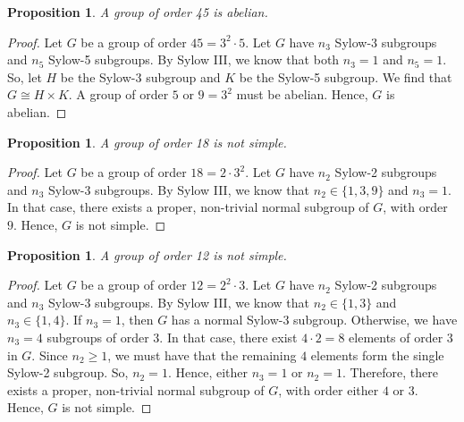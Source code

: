 \documentclass[a4paper, openany]{memoir}
\theoremstyle{definition}
\theoremstyle{plain}
\newtheorem{proposition}[definition]{Proposition}
\begin{document}
    \begin{proposition}
        A group of order 45 is abelian.
    \end{proposition}
    \begin{proof}
        Let $G$ be a group of order $45 = 3^2 \cdot 5$. Let $G$ have $n_3$ Sylow-3 subgroups and $n_5$ Sylow-5 subgroups. By Sylow III, we know that both $n_3 = 1$ and $n_5 = 1$. So, let $H$ be the Sylow-3 subgroup and $K$ be the Sylow-5 subgroup. We find that $G \cong H \times K$. A group of order $5$ or $9 = 3^2$ must be abelian. Hence, $G$ is abelian.
    \end{proof}

    \begin{proposition}
        A group of order 18 is not simple.
    \end{proposition}
    \begin{proof}
        Let $G$ be a group of order $18 = 2 \cdot 3^2$. Let $G$ have $n_2$ Sylow-2 subgroups and $n_3$ Sylow-3 subgroups. By Sylow III, we know that $n_2 \in \{1, 3, 9\}$ and $n_3 = 1$. In that case, there exists a proper, non-trivial normal subgroup of $G$, with order $9$. Hence, $G$ is not simple.
    \end{proof}

    \begin{proposition}
        A group of order 12 is not simple.
    \end{proposition}
    \begin{proof}
        Let $G$ be a group of order $12 = 2^2 \cdot 3$. Let $G$ have $n_2$ Sylow-2 subgroups and $n_3$ Sylow-3 subgroups. By Sylow III, we know that $n_2 \in \{1, 3\}$ and $n_3 \in \{1, 4\}$. If $n_3 = 1$, then $G$ has a normal Sylow-$3$ subgroup. Otherwise, we have $n_3 = 4$ subgroups of order $3$. In that case, there exist $4 \cdot 2 = 8$ elements of order $3$ in $G$. Since $n_2 \geq 1$, we must have that the remaining $4$ elements form the single Sylow-2 subgroup. So, $n_2 = 1$. Hence, either $n_3 = 1$ or $n_2 = 1$. Therefore, there exists a proper, non-trivial normal subgroup of $G$, with order either $4$ or $3$. Hence, $G$ is not simple.
    \end{proof}
    
\end{document}
